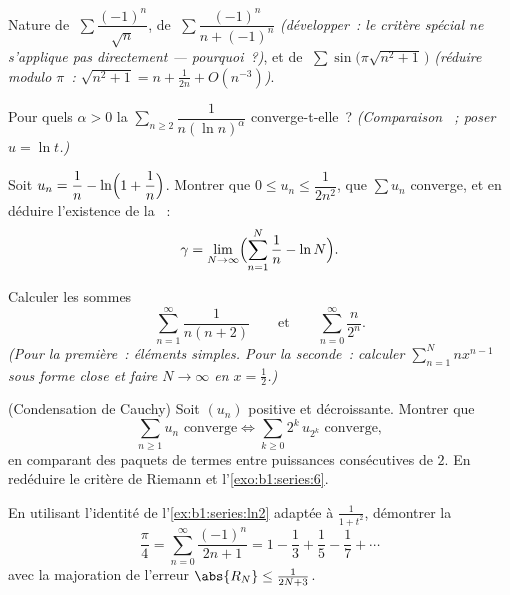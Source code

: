 \begin{exercise}[$\star\star$]\label{exo:b1:series:5}
Nature de $\;\sum \dfrac{(-1)^n}{\sqrt n}$, de $\;\sum
\dfrac{(-1)^n}{n + (-1)^n}$ \emph{(développer~: le critère spécial ne
s'applique pas directement --- pourquoi~?)}, et de $\;\sum
\sin\bigl(\pi\sqrt{n^2+1}\,\bigr)$ \emph{(réduire modulo $\pi$~:
$\sqrt{n^2+1} = n + \frac{1}{2n} + O(n^{-3})$)}.
\end{exercise}

\begin{exercise}[$\star\star$]\label{exo:b1:series:6}
Pour quels $\alpha > 0$ la  $\sum_{n \geq 2}
\dfrac{1}{n (\ln n)^{\alpha}}$ converge-t-elle~? \emph{(Comparaison
~; poser $u = \ln t$.)}
\end{exercise}

\begin{exercise}[$\star\star$]\label{exo:b1:series:7}
Soit $u_n = \dfrac{1}{n} - \ln\Bigl(1 + \dfrac1n\Bigr)$. Montrer que
$0 \leq u_n \leq \dfrac{1}{2n^2}$, que $\sum u_n$ converge, et en
déduire l'existence de la ~:
\[
\gamma = \lim_{N \to \infty} \Bigl( \sum_{n=1}^{N} \frac 1n - \ln N
\Bigr) .
\]
\end{exercise}

\begin{exercise}[$\star\star$]\label{exo:b1:series:8}
Calculer les sommes
\[
\sum_{n=1}^{\infty} \frac{1}{n(n+2)}
\qquad\text{et}\qquad
\sum_{n=0}^{\infty} \frac{n}{2^n} .
\]
\emph{(Pour la première~: éléments simples. Pour la seconde~: calculer
$\sum_{n=1}^{N} n x^{n-1}$ sous forme close et faire $N \to \infty$ en
$x = \frac12$.)}
\end{exercise}

\begin{exercise}[$\star\star\star$]\label{exo:b1:series:9}
(Condensation de Cauchy) Soit $(u_n)$ positive et décroissante.
Montrer que
\[
\sum_{n \geq 1} u_n \text{ converge}
\iff
\sum_{k \geq 0} 2^k\, u_{2^k} \text{ converge},
\]
en comparant des paquets de termes entre puissances consécutives de
$2$. En redéduire le critère de Riemann et
l'\cref{exo:b1:series:6}.
\end{exercise}

\begin{exercise}[$\star\star\star$]\label{exo:b1:series:10}
En utilisant l'identité  de l'\cref{ex:b1:series:ln2}
adaptée à $\frac{1}{1+t^2}$, démontrer la 
\[
\frac{\pi}{4} = \sum_{n=0}^{\infty} \frac{(-1)^n}{2n+1}
= 1 - \frac13 + \frac15 - \frac17 + \cdots
\]
avec la majoration de l'erreur $\abs{R_N} \leq \frac{1}{2N+3}$.
\end{exercise}

